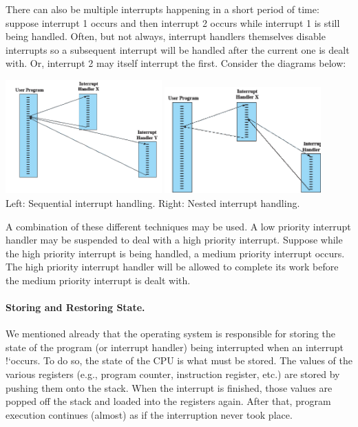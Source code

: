 There can also be multiple interrupts happening in a short period of time: suppose interrupt 1 occurs and then interrupt 2 occurs while interrupt 1 is still being handled. Often, but not always, interrupt handlers themselves disable interrupts so a subsequent interrupt will be handled after the current one is dealt with. Or, interrupt 2 may itself interrupt the first. Consider the diagrams below:

\begin{center}
\includegraphics[width=0.45\textwidth]{images/interrupts-sequential.png}
\includegraphics[width=0.45\textwidth]{images/interrupts-nested.png}\\
Left: Sequential interrupt handling. Right: Nested interrupt handling.~\cite{osi}
\end{center}

A combination of these different techniques may be used. A low priority interrupt handler may be suspended to deal with a high priority interrupt. Suppose while the high priority interrupt is being handled, a medium priority interrupt occurs. The high priority interrupt handler will be allowed to complete its work before the medium priority interrupt is dealt with.


\paragraph{Storing and Restoring State.} We mentioned already that the operating system is responsible for storing the state of the program (or interrupt handler) being interrupted when an interrupt !`occurs. To do so, the state of the CPU is what must be stored. The values of the various registers (e.g., program counter, instruction register, etc.) are stored by pushing them onto the stack. When the interrupt is finished, those values are popped off the stack and loaded into the registers again. After that, program execution continues (almost) as if the interruption never took place.

